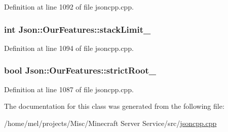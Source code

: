 Definition at line 1092 of file jsoncpp.\+cpp.

\subsubsection[{\texorpdfstring{stack\+Limit\+\_\+}{stackLimit_}}]{\setlength{\rightskip}{0pt plus 5cm}int Json\+::\+Our\+Features\+::stack\+Limit\+\_\+}\hypertarget{class_json_1_1_our_features_a9a786713902d14be6d57a08cc03ccfff}{}\label{class_json_1_1_our_features_a9a786713902d14be6d57a08cc03ccfff}


Definition at line 1094 of file jsoncpp.\+cpp.

\subsubsection[{\texorpdfstring{strict\+Root\+\_\+}{strictRoot_}}]{\setlength{\rightskip}{0pt plus 5cm}bool Json\+::\+Our\+Features\+::strict\+Root\+\_\+}\hypertarget{class_json_1_1_our_features_a2095f66a776c0a4ae6cc931a0c94242e}{}\label{class_json_1_1_our_features_a2095f66a776c0a4ae6cc931a0c94242e}


Definition at line 1087 of file jsoncpp.\+cpp.



The documentation for this class was generated from the following file\+:\begin{DoxyCompactItemize}
\item 
/home/mel/projects/\+Misc/\+Minecraft Server Service/src/\hyperlink{jsoncpp_8cpp}{jsoncpp.\+cpp}\end{DoxyCompactItemize}
